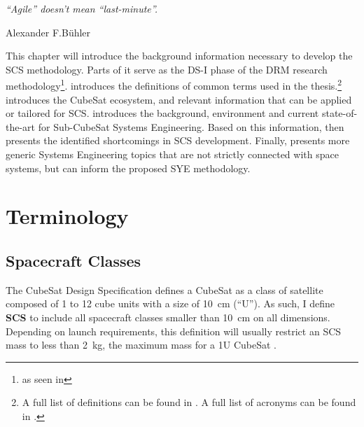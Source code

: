 \documentclass[a4paper,nobib,justified,final]{tufte-book}
\begin{document}
\begin{fullwidth}
\epigraph{\emph{%
		``Agile'' doesn't mean ``last-minute''.}}{Alexander F.\@ B\"uhler}
\end{fullwidth}

This chapter will introduce the background information necessary to develop the \ac{SCS} methodology.
Parts of it serve as the DS-I phase of the \acs{DRM} research methodology\footnote{as seen in }.  introduces the definitions of common terms used in the thesis.\footnote{A full list of definitions can be found in . A full list of acronyms can be found in .}  introduces the CubeSat ecosystem, and relevant information that can be applied or tailored for \acs{SCS}.  introduces the background, environment and current state-of-the-art for Sub-CubeSat Systems Engineering. Based on this information,  then presents the identified shortcomings in \acs{SCS} development. Finally,  presents more generic Systems Engineering topics that are not strictly connected with space systems, but can inform the proposed \acs{SYE} methodology.

\section{Terminology}
\label{sec:LITERATURE_terminology}

\subsection{Spacecraft Classes}
\label{sec:LITERATURE_classes}


The CubeSat Design Specification \autocite{CDS14} defines a CubeSat as a class of satellite composed of 1 to 12 cube units with a size of \SI{10}{\centi\meter}  (``U''). As such, I define \textbf{\acf{SCS}} to include all spacecraft classes smaller than \SI{10}{\centi\meter} on all dimensions. Depending on launch requirements, this definition will usually restrict an \acs{SCS} mass to less than \SI{2}{\kg}, the maximum mass for a 1U CubeSat \cite{CDS14}.
\end{document}
